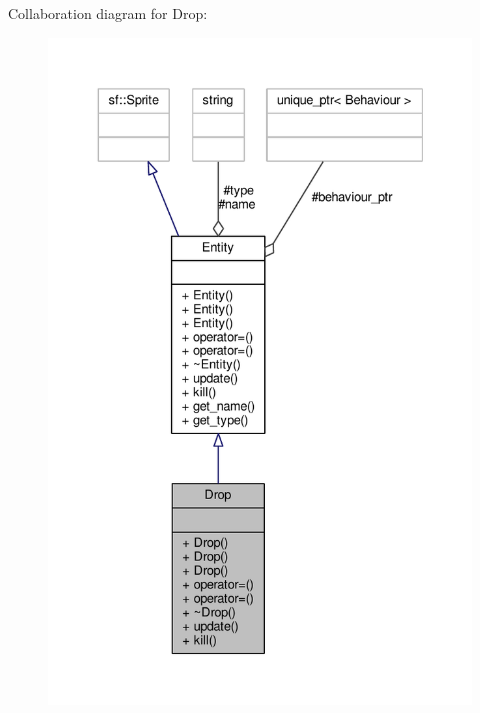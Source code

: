 Collaboration diagram for Drop\+:\nopagebreak
\begin{figure}[H]
\begin{center}
\leavevmode
\includegraphics[width=336pt]{classDrop__coll__graph}
\end{center}
\end{figure}
